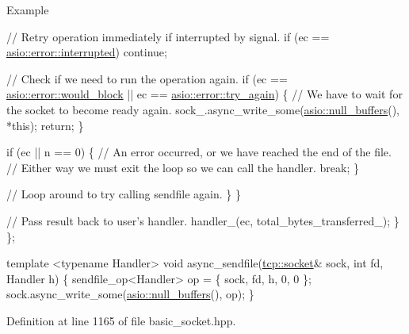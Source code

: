 \begin{DoxyParagraph}{Example}
\begin{DoxyCode}
        \textcolor{comment}{// Retry operation immediately if interrupted by signal.}
        \textcolor{keywordflow}{if} (ec == \hyperlink{namespaceasio_1_1error_a2a69445eee784059ac2f4a6c4f5fe90da949a87be73ee9cdca623f92fb27cd45c}{asio::error::interrupted})
          \textcolor{keywordflow}{continue};

        \textcolor{comment}{// Check if we need to run the operation again.}
        \textcolor{keywordflow}{if} (ec == \hyperlink{namespaceasio_1_1error_a2a69445eee784059ac2f4a6c4f5fe90da8e8ff1984495eb85ec17c37e3e5a89e5}{asio::error::would\_block}
            || ec == \hyperlink{namespaceasio_1_1error_a2a69445eee784059ac2f4a6c4f5fe90da6e9965827dc7afaba3b2b90a02b19058}{asio::error::try\_again})
        \{
          \textcolor{comment}{// We have to wait for the socket to become ready again.}
          sock\_.async\_write\_some(\hyperlink{classasio_1_1null__buffers}{asio::null\_buffers}(), *\textcolor{keyword}{this});
          \textcolor{keywordflow}{return};
        \}

        \textcolor{keywordflow}{if} (ec || n == 0)
        \{
          \textcolor{comment}{// An error occurred, or we have reached the end of the file.}
          \textcolor{comment}{// Either way we must exit the loop so we can call the handler.}
          \textcolor{keywordflow}{break};
        \}

        \textcolor{comment}{// Loop around to try calling sendfile again.}
      \}
    \}

    \textcolor{comment}{// Pass result back to user's handler.}
    handler\_(ec, total\_bytes\_transferred\_);
  \}
\};

\textcolor{keyword}{template} <\textcolor{keyword}{typename} Handler>
\textcolor{keywordtype}{void} async\_sendfile(\hyperlink{namespacewebsocketpp_1_1transport_1_1asio_1_1socket_1_1error_a828ddaa5ed63a761e1b557465a35f05aa0c31b356014843e1d09514e794a539a7}{tcp::socket}& sock, \textcolor{keywordtype}{int} fd, Handler h)
\{
  sendfile\_op<Handler> op = \{ sock, fd, h, 0, 0 \};
  sock.async\_write\_some(\hyperlink{classasio_1_1null__buffers}{asio::null\_buffers}(), op);
\} 
\end{DoxyCode}
 
\end{DoxyParagraph}


Definition at line 1165 of file basic\+\_\+socket.\+hpp.

\hypertarget{classasio_1_1basic__socket_a35caacbf13740a3ced686730fc730115}{}
